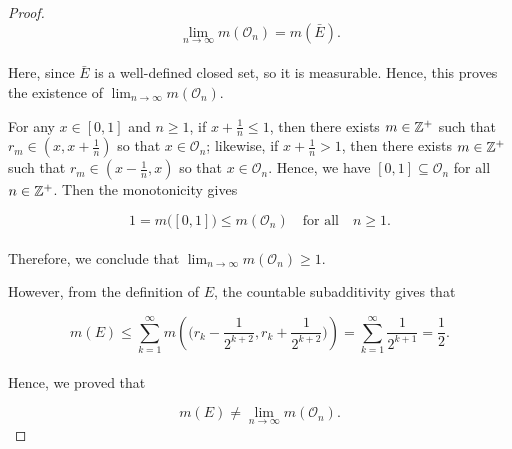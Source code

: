 \documentclass[12pt, a4paper, openany, twoside]{book}
\theoremstyle{definition}
\theoremstyle{remark}
\theoremstyle{plain}
\numberwithin{equation}{section}
\begin{document}
\begin{proof}
    \[\lim_{n\rightarrow\infty}{m(\mathcal{O}_n)}=m(\bar{E}).\]
    \\
    Here, since $\bar{E}$ is a well-defined closed set, so it is measurable. Hence, this proves the existence of $\lim_{n\rightarrow\infty}{m(\mathcal{O}_n)}$.
    
    For any $x\in [0,1]$ and $n\geq1$, if $x+\frac{1}{n}\leq 1$, then there exists $m\in{\mathbb {Z}}^+$ such that $r_m\in (x,x+\frac{1}{n})$ so that $x\in\mathcal{O}_n$; likewise, if $x+\frac{1}{n}>1$, then there exists $m\in{\mathbb {Z}}^+$ such that $r_m\in (x-\frac{1}{n},x)$ so that $x\in\mathcal{O}_n$. Hence, we have $[0,1]\subseteq\mathcal{O}_n$ for all $n\in{\mathbb {Z}}^+$. Then the monotonicity gives

    \[1=m\big([0,1]\big)\leq m(\mathcal{O}_n)\quad\text{for all}\quad n\geq1.\]
    \\
    Therefore, we conclude that $\lim_{n\rightarrow\infty}{m(\mathcal{O}_n)}\geq 1$.
    
    However, from the definition of $E$, the countable subadditivity gives that

    \[m(E)\leq\sum_{k=1}^{\infty}{m\left(\Big(r_k-\frac{1}{2^{k+2}},r_k+\frac{1}{2^{k+2}}\Big)\right)}=\sum_{k=1}^{\infty}{\frac{1}{2^{k+1}}}=\frac{1}{2}.\]
    \\
    Hence, we proved that

    \[m(E)\neq\lim_{n\rightarrow\infty}{m(\mathcal{O}_n)}.\]
\end{proof}

\newpage
\end{document}

